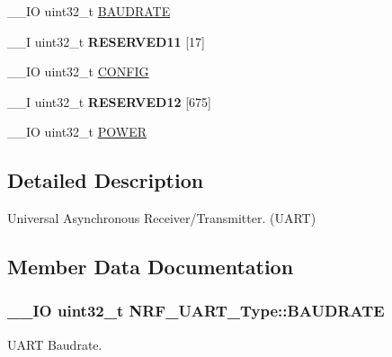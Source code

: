 \begin{DoxyCompactItemize}
\item 
\+\_\+\+\_\+\+I\+O uint32\+\_\+t \hyperlink{struct_n_r_f___u_a_r_t___type_ae161853a66eab7a596691abc2ac8a7a9}{B\+A\+U\+D\+R\+A\+T\+E}
\item 
\hypertarget{struct_n_r_f___u_a_r_t___type_aa4aeeabf2f4e9ce267aa19d104fbf114}{}\+\_\+\+\_\+\+I uint32\+\_\+t {\bfseries R\+E\+S\+E\+R\+V\+E\+D11} \mbox{[}17\mbox{]}\label{struct_n_r_f___u_a_r_t___type_aa4aeeabf2f4e9ce267aa19d104fbf114}

\item 
\+\_\+\+\_\+\+I\+O uint32\+\_\+t \hyperlink{struct_n_r_f___u_a_r_t___type_a5a8a79667beb288367f38fb4e75afd54}{C\+O\+N\+F\+I\+G}
\item 
\hypertarget{struct_n_r_f___u_a_r_t___type_a9bab622b0169f28815b971b76a1dec42}{}\+\_\+\+\_\+\+I uint32\+\_\+t {\bfseries R\+E\+S\+E\+R\+V\+E\+D12} \mbox{[}675\mbox{]}\label{struct_n_r_f___u_a_r_t___type_a9bab622b0169f28815b971b76a1dec42}

\item 
\+\_\+\+\_\+\+I\+O uint32\+\_\+t \hyperlink{struct_n_r_f___u_a_r_t___type_aa8acbe6f58bef8a54b0bbef2986aa629}{P\+O\+W\+E\+R}
\end{DoxyCompactItemize}


\subsection{Detailed Description}
Universal Asynchronous Receiver/\+Transmitter. (U\+A\+R\+T) 

\subsection{Member Data Documentation}
\hypertarget{struct_n_r_f___u_a_r_t___type_ae161853a66eab7a596691abc2ac8a7a9}{}
\subsubsection[{B\+A\+U\+D\+R\+A\+T\+E}]{\setlength{\rightskip}{0pt plus 5cm}\+\_\+\+\_\+\+I\+O uint32\+\_\+t N\+R\+F\+\_\+\+U\+A\+R\+T\+\_\+\+Type\+::\+B\+A\+U\+D\+R\+A\+T\+E}\label{struct_n_r_f___u_a_r_t___type_ae161853a66eab7a596691abc2ac8a7a9}
U\+A\+R\+T Baudrate. \hypertarget{struct_n_r_f___u_a_r_t___type_a5a8a79667beb288367f38fb4e75afd54}{}
